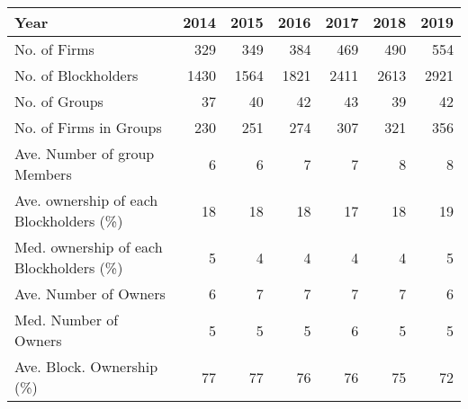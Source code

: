 \begin{tabular}{lrrrrrr}
\toprule
Year &  2014 &  2015 &  2016 &  2017 &  2018 &  2019 \\
\midrule
No. of Firms                            &   329 &   349 &   384 &   469 &   490 &   554 \\
No. of Blockholders                     &  1430 &  1564 &  1821 &  2411 &  2613 &  2921 \\
No. of Groups                           &    37 &    40 &    42 &    43 &    39 &    42 \\
No. of Firms in Groups                  &   230 &   251 &   274 &   307 &   321 &   356 \\
Ave. Number of group Members            &     6 &     6 &     7 &     7 &     8 &     8 \\
Ave. ownership of each Blockholders (\%) &    18 &    18 &    18 &    17 &    18 &    19 \\
Med. ownership of each Blockholders (\%) &     5 &     4 &     4 &     4 &     4 &     5 \\
Ave. Number of Owners                   &     6 &     7 &     7 &     7 &     7 &     6 \\
Med. Number of Owners                   &     5 &     5 &     5 &     6 &     5 &     5 \\
Ave. Block. Ownership (\%)               &    77 &    77 &    76 &    76 &    75 &    72 \\
\bottomrule
\end{tabular}

